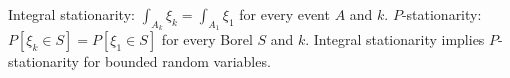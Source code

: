 Integral stationarity: $\int_{A_k} \xi_k = \int_{A_1} \xi_1$ for every event $A$ and $k$. $P$-stationarity: $P[\xi_k \in S] = P[\xi_1 \in S]$ for every Borel $S$ and $k$. Integral stationarity implies $P$-stationarity for bounded random variables.

